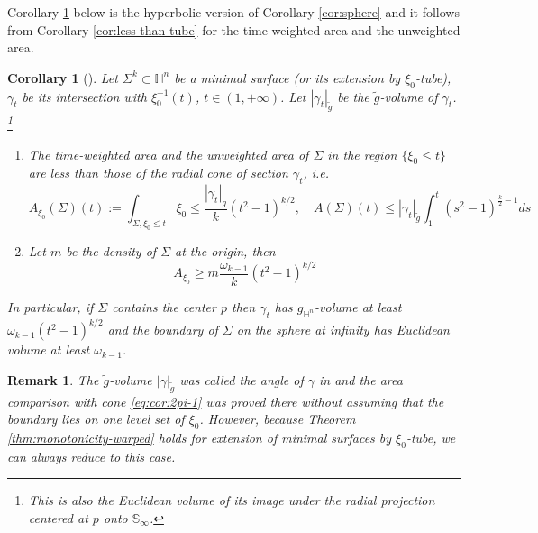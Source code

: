 \documentclass[11pt]{article}
\newtheorem{remark}[theorem]{Remark}
\newtheorem{corollary}[theorem]{Corollary}
\begin{document}
Corollary \ref{cor:2pi} below is the hyperbolic version of Corollary \ref{cor:sphere} and it
follows from Corollary \ref{cor:less-than-tube} for the time-weighted area and the
unweighted area.

\begin{corollary}[]
\label{cor:2pi}
Let \(\Sigma^k \subset \mathbb{H}^n\) be a minimal surface (or its extension by \(\xi_0\)-tube), \(\gamma_t\) be its
intersection with \(\xi_0^{-1}(t)\), \(t\in(1,+\infty)\). Let \(|\gamma_t|_{\tilde g}\) be the \(\tilde g\)-volume of \(\gamma_t\). \footnote{This is also the Euclidean volume of its image under the radial projection centered at \(p\)
onto \(\mathbb{S}_{\infty}\).}
\begin{enumerate}
\item The time-weighted area and the unweighted area of \(\Sigma\) in the region \(\{\xi_0 \leq t\}\) are
less than those of the radial cone of section \(\gamma_t\), i.e.
\begin{equation}
\label{eq:cor:2pi-1}
A_{\xi_0}(\Sigma)(t):=\int_{\Sigma, \xi_0\leq t}\xi_0 \leq \frac{|\gamma_t|_{\tilde g}}{k}(t^2-1)^{k/2},\quad A(\Sigma)(t)\leq |\gamma_t|_{\tilde g} \int_{1}^t (s^2-1)^{\frac{k}{2}-1}ds
\end{equation}
\item Let \(m\) be the density of \(\Sigma\) at the origin, then
\begin{equation}
\label{eq:cor:2pi-2}
A_{\xi_0} \geq m\frac{\omega_{k-1}}{k}(t^2-1)^{k/2} 
\end{equation}
\end{enumerate}
In particular, if \(\Sigma\) contains the center \(p\) then \(\gamma_t\) has \(g_{\mathbb{H}^n}\)-volume at least \(\omega_{k-1}(t^2-1)^{k/2}\) 
and the boundary of \(\Sigma\) on the sphere at infinity has Euclidean volume at least \(\omega_{k-1}\).
\end{corollary}

\begin{remark}
\label{rem:choe-gulliver-bndry}
The \(\tilde g\)-volume \(|\gamma|_{\tilde g}\) was called the \emph{angle} of \(\gamma\) in
\cite{Choe.Gulliver92_SharpIsoperimetricInequality} and the area comparison with cone \eqref{eq:cor:2pi-1}
was proved there without assuming that the boundary lies on one level set of \(\xi_0\). However, because Theorem \ref{thm:monotonicity-warped} holds for extension of minimal
surfaces by \(\xi_0\)-tube, we can always reduce to this case.
\end{remark}
\end{document}
